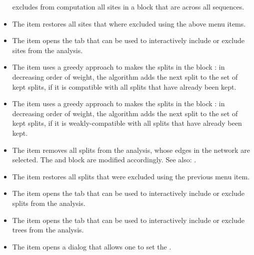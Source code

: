 \documentclass[11pt]{article}
\begin{document}
\begin{itemize}
excludes from computation all sites in a  block that
are  across all sequences.
\item The  item
restores all sites that where excluded using the above menu items.
\item The  item
opens the  tab that can be used to
interactively
include or exclude sites from the analysis.
\item The  item
uses a greedy approach to makes the splits in the  block
: in decreasing order of weight, the algorithm adds the next split
to the set of kept splits, if it is compatible with all splits that have
already been kept.
\item The  item
uses a greedy approach to makes the splits in the  block
: in decreasing order of weight, the algorithm adds the next split
to the set of kept splits, if it is weakly-compatible with all splits that have
already been kept.
\item The  item
removes all splits from the analysis, whose edges in the network are
selected. The  and 
block are modified accordingly.
See also: .
\item The  item
restores all splits that were excluded using the previous menu item.
\item The  item
opens the  tab that can be used to
interactively
include or exclude splits from the analysis.
\item The  item
opens the  tab that can be used to
interactively
include or exclude trees from the analysis.
\item The  item opens a dialog that allows
one to set the .
\end{itemize}


\end{document}

